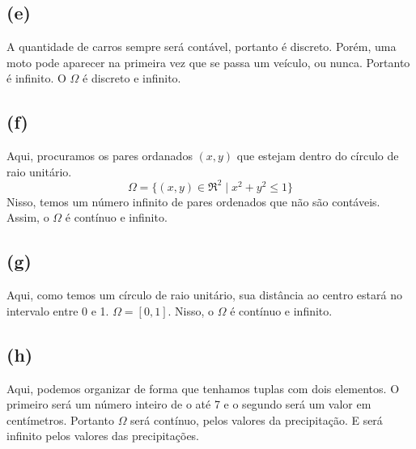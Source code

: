 \documentclass{article}
\begin{document}
\subsection*{(e)}
A quantidade de carros sempre será contável, portanto é discreto. Porém, uma moto pode aparecer na primeira vez que se passa um veículo, ou nunca. Portanto é infinito. O $\Omega$ é discreto e infinito.

\subsection*{(f)}
Aqui, procuramos os pares ordanados $(x, y)$ que estejam dentro do círculo de raio unitário.
\[\Omega = \{(x, y) \in \Re^2 \mid x^2 + y^2 \leq 1\}\]
Nisso, temos um número infinito de pares ordenados que não são contáveis. Assim, o $\Omega$ é contínuo e infinito.

\subsection*{(g)}
Aqui, como temos um círculo de raio unitário, sua distância ao centro estará no intervalo entre 0 e 1. $\Omega = [0, 1]$. Nisso, o $\Omega$ é contínuo e infinito.

\subsection*{(h)}
Aqui, podemos organizar de forma que tenhamos tuplas com dois elementos. O primeiro será um número inteiro de o até 7 e o segundo será um valor em centímetros. Portanto $\Omega$ será contínuo, pelos valores da precipitação. E será infinito pelos valores das precipitações.
\end{document}
